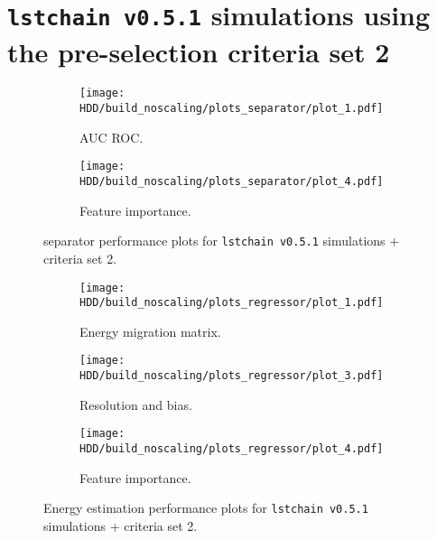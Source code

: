 \section{\texttt{lstchain v0.5.1} simulations using the pre-selection criteria set 2}
\begin{figure}
    \centering
    \begin{subfigure}{0.6\textwidth}
        \centering
        \texttt{[image: HDD/build\_noscaling/plots\_separator/plot\_1.pdf]}
        \caption{AUC ROC.}
        \label{fig:separator_oldMC_150}
    \end{subfigure}
    \vfill
    \begin{subfigure}{0.6\textwidth}
        \centering
        \texttt{[image: HDD/build\_noscaling/plots\_separator/plot\_4.pdf]}
        \caption{Feature importance.}
        \label{fig:separator_oldMC_150_feature}
    \end{subfigure}
    \caption{separator performance plots for \texttt{lstchain v0.5.1} simulations + criteria set 2.}
\end{figure}

\begin{figure}
    \centering
    \begin{subfigure}{0.49\textwidth}
        \centering
        \texttt{[image: HDD/build\_noscaling/plots\_regressor/plot\_1.pdf]}
        \caption{Energy migration matrix.}
    \end{subfigure}
    \hfill
    \begin{subfigure}{0.49\textwidth}
        \centering
        \texttt{[image: HDD/build\_noscaling/plots\_regressor/plot\_3.pdf]}
        \caption{Resolution and bias.}
    \end{subfigure}
    \newline\vfill
    \begin{subfigure}{0.49\textwidth}
        \centering
        \texttt{[image: HDD/build\_noscaling/plots\_regressor/plot\_4.pdf]}
        \caption{Feature importance.}
    \end{subfigure}
    \caption{Energy estimation performance plots for \texttt{lstchain v0.5.1} simulations + criteria set 2.}
    \label{fig:regressor_oldMC_150}
\end{figure}

